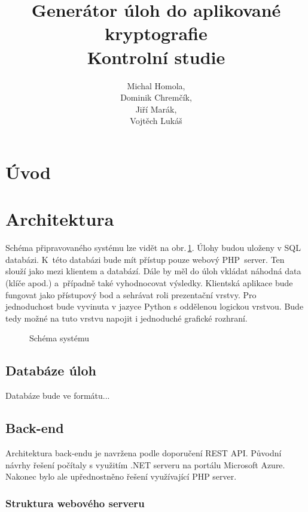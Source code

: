 \documentclass[titlepage]{article}
\title{Generátor úloh do aplikované kryptografie\\Kontrolní studie}
\author{Michal Homola,\\Dominik Chremčík,\\Jiří Marák,\\Vojtěch Lukáš}
\begin{document}
\maketitle

\tableofcontents

\section*{Úvod}

\section{Architektura}
Schéma připravovaného systému lze vidět na obr.\,\ref{fig:sys}. Úlohy budou uloženy v SQL databázi. K~této databázi bude mít přístup pouze webový PHP~server. Ten slouží jako  mezi klientem a databází. Dále by měl do úloh vkládat náhodná data (klíče apod.) a~případně také vyhodnocovat výsledky. 
Klientská aplikace bude fungovat jako přístupový bod a sehrávat roli prezentační vrstvy. Pro jednoduchost bude vyvinuta v jazyce Python s oddělenou logickou vrstvou. Bude tedy možné na tuto vrstvu napojit i jednoduché grafické rozhraní. 
\begin{figure}[h!]
    \centering
        
    \caption{Schéma systému}
    \label{fig:sys}
\end{figure}




\subsection{Databáze úloh}
Databáze bude ve formátu...

\subsection{Back-end}
Architektura back-endu je navržena podle doporučení REST API. Původní návrhy řešení počítaly s využitím .NET serveru na portálu Microsoft Azure. Nakonec bylo ale upřednostněno řešení využívající PHP server. 
\subsubsection{Struktura webového serveru}
\end{document}
